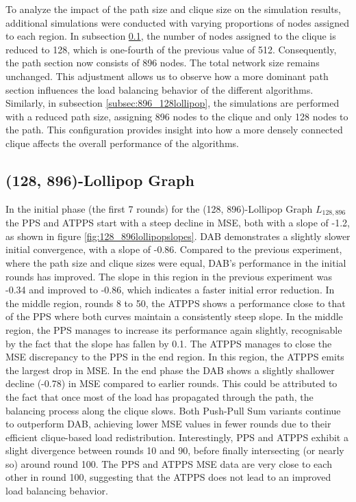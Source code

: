 To analyze the impact of the path size and clique size on the simulation results, additional simulations were conducted with varying proportions of nodes assigned to each region. In subsection \ref{subsec:128_896lollipop}, the number of nodes assigned to the clique is reduced to 128, which is one-fourth of the previous value of 512. Consequently, the path section now consists of 896 nodes. The total network size remains unchanged. This adjustment allows us to observe how a more dominant path section influences the load balancing behavior of the different algorithms. Similarly, in subsection \ref{subsec:896_128lollipop}, the simulations are performed with a reduced path size, assigning 896 nodes to the clique and only 128 nodes to the path. This configuration provides insight into how a more densely connected clique affects the overall performance of the algorithms.

\subsection{(128, 896)-Lollipop Graph}\label{subsec:128_896lollipop}
In the initial phase (the first 7 rounds) for the (128, 896)-Lollipop Graph $L_{128,896}$ the PPS and ATPPS start with a steep decline in MSE, both with a slope of -1.2, as shown in figure \ref{fig:128_896lollipopslopes}. DAB demonstrates a slightly slower initial convergence, with a slope of -0.86. Compared to the previous experiment, where the path size and clique sizes were equal, DAB's performance in the initial rounds has improved. The slope in this region in the previous experiment was -0.34 and improved to -0.86, which indicates a faster initial error reduction. In the middle region, rounds 8 to 50, the ATPPS shows a performance close to that of the PPS where both curves maintain a consistently steep slope. In the middle region, the PPS manages to increase its performance again slightly, recognisable by the fact that the slope has fallen by 0.1. The ATPPS manages to close the MSE discrepancy to the PPS in the end region. In this region, the ATPPS emits the largest drop in MSE. In the end phase the DAB shows a slightly shallower decline (-0.78) in MSE compared to earlier rounds. This could be attributed to the fact that once most of the load has propagated through the path, the balancing process along the clique slows. Both Push-Pull Sum variants continue to outperform DAB, achieving lower MSE values in fewer rounds due to their efficient clique-based load redistribution. Interestingly, PPS and ATPPS exhibit a slight divergence between rounds 10 and 90, before finally intersecting (or nearly so) around round 100. The PPS and ATPPS MSE data are very close to each other in round 100, suggesting that the ATPPS does not lead to an improved load balancing behavior. 

